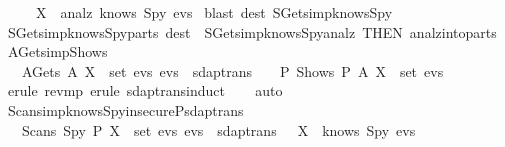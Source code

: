 \begin{isabellebody}
  \ \ \ \ {\isasymLongrightarrow}\ X\ {\isasymin}\ analz\ {\isacharparenleft}knows\ Spy\ evs{\isacharparenright}{\isachardoublequoteclose}\isanewline
  \isadelimproof
  \endisadelimproof
  \isatagproof
  \isamarkupfalse%
  \ {\isacharparenleft}blast\ dest{\isacharbang}{\isacharcolon}\ SGets{\isacharunderscore}imp{\isacharunderscore}knows{\isacharunderscore}Spy{\isacharparenright}%
  \endisatagproof
  {\isafoldproof}%
  \isadelimproof
  \isanewline
  \endisadelimproof
  \isanewline
  \isamarkupfalse%
  \ SGets{\isacharunderscore}imp{\isacharunderscore}knows{\isacharunderscore}Spy{\isacharunderscore}parts\ {\isacharbrackleft}dest{\isacharbrackright}\ {\isacharequal}\ SGets{\isacharunderscore}imp{\isacharunderscore}knows{\isacharunderscore}Spy{\isacharunderscore}analz\ {\isacharbrackleft}THEN\ analz{\isacharunderscore}into{\isacharunderscore}parts{\isacharbrackright}\isanewline
  \isanewline
  \isamarkupfalse%
  \ AGets{\isacharunderscore}imp{\isacharunderscore}Shows\ {\isacharcolon}\isanewline
  \ \ {\isachardoublequoteopen}{\isasymlbrakk}\ AGets\ A\ X\ {\isasymin}\ set\ evs{\isacharsemicolon}\ evs\ {\isasymin}\ sdaptrans\ {\isasymrbrakk}\ {\isasymLongrightarrow}\ {\isasymexists}\ P{\isachardot}\ Shows\ P\ A\ X\ {\isasymin}\ set\ evs{\isachardoublequoteclose}\isanewline
  \isadelimproof
  \isanewline
  \ \ %
  \endisadelimproof
  \isatagproof
  \isamarkupfalse%
  \ {\isacharparenleft}erule\ rev{\isacharunderscore}mp{\isacharcomma}\ erule\ sdaptrans{\isachardot}induct{\isacharparenright}\isanewline
  \ \ \isamarkupfalse%
  \ {\isacharparenleft}auto{\isacharparenright}\isanewline
  \isamarkupfalse%
  \endisatagproof
  {\isafoldproof}%
  \isadelimproof
  \endisadelimproof
  \isadelimdocument
  \endisadelimdocument
  \isatagdocument
  \isamarkuptrue%
  \endisatagdocument
  {\isafolddocument}%
  \isadelimdocument
  \endisadelimdocument
  \isamarkupfalse%
  \ Scans{\isacharunderscore}imp{\isacharunderscore}knows{\isacharunderscore}Spy{\isacharunderscore}insecureP{\isacharunderscore}sdaptrans\ {\isacharcolon}\isanewline
  \ \ {\isachardoublequoteopen}{\isasymlbrakk}\ Scans\ Spy\ P\ X\ {\isasymin}\ set\ evs{\isacharsemicolon}\ evs\ {\isasymin}\ sdaptrans\ {\isasymrbrakk}\ {\isasymLongrightarrow}\ X\ {\isasymin}\ knows\ Spy\ evs{\isachardoublequoteclose}\isanewline
  \isadelimproof
  \isanewline
  \ \ %
  \endisadelimproof

\end{isabellebody}
